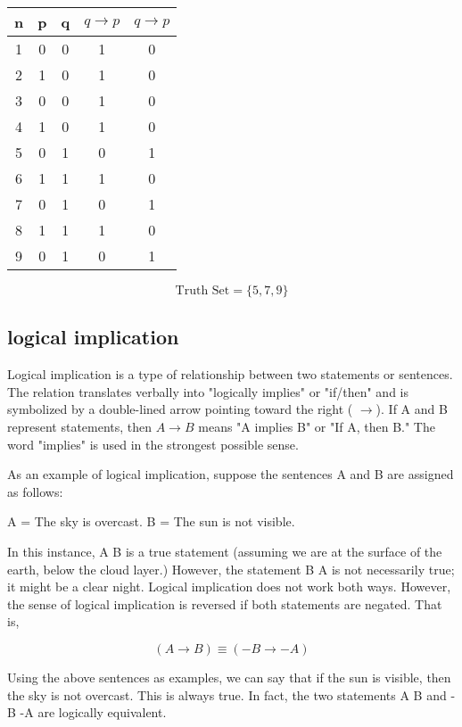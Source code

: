 \documentclass[]{report}
\begin{document}
\begin{tabular}{|c|c|c|c|c|}
\hline n & p & q & $  q \rightarrow p$ & $  q \rightarrow p$ \\ 
\hline 1 & 0 & 0 & 1 & 0\\ 
\hline 2 & 1 & 0 & 1 & 0\\ 
\hline 3 & 0 & 0 & 1 & 0\\ 
\hline 4 & 1 & 0 & 1 & 0\\ 
\hline 5 & 0 & 1 & 0 & 1\\ 
\hline 6 & 1 & 1 & 1 & 0\\ 
\hline 7 & 0 & 1 & 0 & 1\\ 
\hline 8 & 1 & 1 & 1 & 0\\ 
\hline 9 & 0 & 1 & 0 & 1\\ 
\hline 
\end{tabular} 
\[\mbox{Truth Set} = \{5,7,9\}\]

\subsection{logical implication}


Logical implication is a type of relationship between two statements or sentences. The relation translates verbally into "logically implies" or "if/then" and is symbolized by a double-lined arrow pointing toward the right ( $\rightarrow$). If A and B represent statements, then $A\rightarrow B$ means "A implies B" or "If A, then B." The word "implies" is used in the strongest possible sense.


As an example of logical implication, suppose the sentences A and B are assigned as follows:

A = The sky is overcast.
B = The sun is not visible.

In this instance, A B is a true statement (assuming we are at the surface of the earth, below the cloud layer.) However, the statement B A is not necessarily true; it might be a clear night. Logical implication does not work both ways. However, the sense of logical implication is reversed if both statements are negated. That is,

$$(A \rightarrow B)  \equiv (-B \rightarrow -A)$$

Using the above sentences as examples, we can say that if the sun is visible, then the sky is not overcast. This is always true. In fact, the two statements A B and -B -A are logically equivalent.
\end{document}
